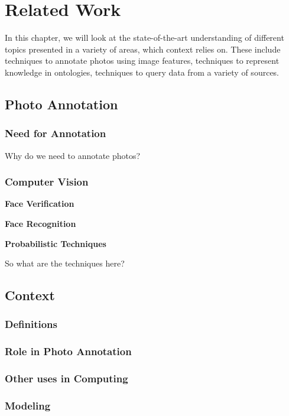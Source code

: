 \chapter{Related Work}

In this chapter, we will look at the state-of-the-art understanding of different topics presented in a variety of areas, which context relies on. These include techniques to annotate photos using image features, techniques to represent knowledge in ontologies, techniques to query data from a variety of sources.

\section{Photo Annotation}

\subsection{Need for Annotation}

Why do we need to annotate photos?

\subsection{Computer Vision}
\textbf{Face Verification}

\textbf{Face Recognition}

\textbf{Probabilistic Techniques}

So what are the techniques here?

\section{Context}

\subsection{Definitions}

\subsection{Role in Photo Annotation}

\subsection{Other uses in Computing}

\subsection{Modeling}

